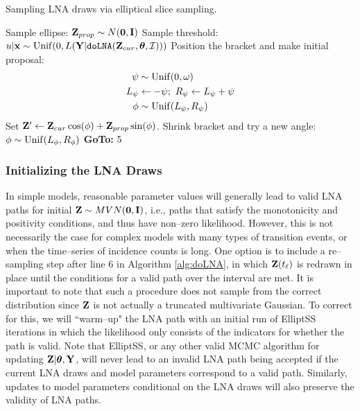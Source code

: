 \begin{algorithm}[htbp]
	\caption{Sampling LNA draws via elliptical slice sampling.}
	\label{alg:elliptss_lna}
	\begin{algorithmic}[1]
		\State Sample ellipse: $ \mathbf{Z}_{prop} \sim N(\boldsymbol{0}, \mathbf{I}) $
		\State Sample threshold: $ u|\mathbf{x} \sim \mathrm{Unif}(0, L(\mathbf{Y}|\texttt{doLNA}(\mathbf{Z}_{cur},\boldsymbol{\theta},\mathcal{I}))) $
		\State Position the bracket and make initial proposal: \vspace{-0.1in}
		\begin{align*}
		\psi &\sim \mathrm{Unif}(0,\omega)\\
		L_\psi &\leftarrow -\psi;\ R_\psi \leftarrow L_\psi + \psi\\
		\phi &\sim \mathrm{Unif}(L_\psi,R_\psi)
		\end{align*}
		\State Set $ \mathbf{Z}' \leftarrow \mathbf{Z}_{cur}\cos(\phi) + \mathbf{Z}_{prop}\sin(\phi) $. 
		\State{}
		\Else
		\State Shrink bracket and try a new angle:
		\State $ \phi \sim \mathrm{Unif}(L_\phi, R_\phi) $
		\State \textbf{GoTo:} 5
		\EndIf
		\EndProcedure
	\end{algorithmic}
\end{algorithm}

\subsubsection{Initializing the LNA Draws}
\label{subsubsec:lna_init}
In simple models, reasonable parameter values will generally lead to valid LNA paths for initial $ \mathbf{Z}\sim MVN(\boldsymbol{0},\mathbf{I}) $, i.e., paths that satisfy the monotonicity and positivity conditions, and thus have non--zero likelihood. However, this is not necessarily the case for complex models with many types of transition events, or when the time--series of incidence counts is long. One option is to include a re--sampling step after line 6 in Algorithm \ref{alg:doLNA}, in which $ \mathbf{Z}(t_\ell) $ is redrawn in place until the conditions for a valid path over the interval are met. It is important to note that such a procedure does not sample from the correct distribution since $ \mathbf{Z} $ is not actually a truncated multivariate Gaussian. To correct for this, we will ``warm--up" the LNA path with an initial run of ElliptSS iterations in which the likelihood only consists of the indicators for whether the path is valid. Note that ElliptSS, or any other valid MCMC algorithm for updating $ \mathbf{Z}|\boldsymbol{\theta},\mathbf{Y} $, will never lead to an invalid LNA path being accepted if the current LNA draws and model parameters correspond to a valid path. Similarly, updates to model parameters conditional on the LNA draws will also preserve the validity of LNA paths.

